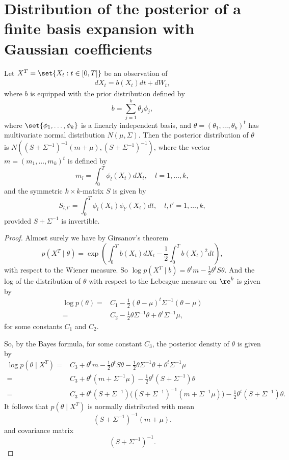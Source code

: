 \documentclass[12pt]{article}
\begin{document}
\section{Distribution of the posterior of a finite basis expansion with Gaussian coefficients}

\begin{lemma}
	Let \(X^T=\set{X_t:t\in[0,T]}\) be an observation of 
	\begin{align*}
		dX_t=b(X_t)dt+dW_t,
	\end{align*}
	where \(b\) is equipped with the prior distribution defined by 
	\[
	b=\sum_{j=1}^k\theta_j\phi_j,
	\]
	where \(\set{\phi_1,\ldots,\phi_k}\) is a linearly independent basis, and \(\theta=(\theta_1,\ldots,\theta_k)^t\) has multivariate normal distribution \(N(\mu,\Sigma)\). Then the  posterior distribution of \(\theta\) is \(N((S+\Sigma^{-1})^{-1}(m+\mu), (S+\Sigma^{-1})^{-1})\), where the vector \(m=(m_1,\ldots,m_k)^t\) is defined by 
	\[
	m_l=\int_0^T\phi_l(X_t)dX_t, \quad l=1,\ldots,k,
	\] 
	and the symmetric \(k\times k\)-matrix \(S\) is given by 
	\[
	S_{l,l'}=\int_0^T\phi_l(X_t)\phi_{l'}(X_t)dt,\quad l,l'=1,\ldots,k,
	\]
	provided \(S+\Sigma^{-1}\) is invertible. 
\end{lemma}
\begin{proof}Almost surely we have by Girsanov's theorem\begin{equation}\label{eq:girsanov}
p(X^T\mid \theta)=\exp\left(\int_0^Tb(X_t)dX_t-\frac12\int_0^Tb(X_t)^2dt\right),
\end{equation}with respect to the Wiener measure. So \(\log p(X^T\mid b)=\theta^tm - \frac 1 2 \theta^t S\theta\). And the log of the distribution of \(\theta\) with respect to the Lebesgue measure on \(\re^k\) is given by
\begin{align*}
	\log p(\theta)= &C_1 - \frac 1 2 (\theta-\mu)^t\Sigma^{-1}(\theta-\mu) \\
	= &C_2 - \frac 1 2 \theta\Sigma^{-1}\theta +\theta^t\Sigma^{-1}\mu,
\end{align*}
for some constants \(C_1\) and \(C_2\). 

So, by the Bayes formula, for some constant \(C_3\), the posterior density of \(\theta\) is given by\begin{align*}
	\log p(\theta\mid X^T) = & C_3 + \theta^tm - \frac 1 2 \theta^t S\theta - \frac 1 2 \theta\Sigma^{-1}\theta +\theta^t\Sigma^{-1}\mu\\
	= & C_3 + \theta^t ( m + \Sigma^{-1} \mu ) - \frac 1 2 \theta^t (S+\Sigma^{-1}) \theta\\
	= & C_3 + \theta^t ( S + \Sigma^{-1} )  \Big  ( ( S + \Sigma^{-1} )^{-1} (m + \Sigma^{-1}\mu )\Big) - \frac 1 2 \theta^t (S+\Sigma^{-1}) \theta. 
\end{align*}It follows that  \(p(\theta\mid X^T)\) is normally distributed with mean 
\[( S + \Sigma^{-1} )^{-1} (m + \mu).\]
 and covariance matrix \[(S+\Sigma^{-1})^{-1}.\]
\end{proof}
\end{document}
